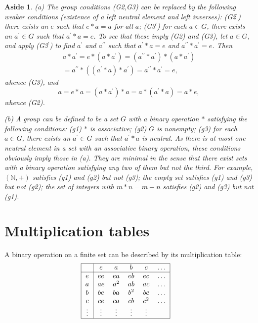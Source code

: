 \documentclass[a4paper,11pt,final]{memoir}%
\newtheorem{aside}[X]{Aside}
\theoremstyle{nonumberplain}
\begin{document}
\begin{aside}
\label{bd3z}(a) The group conditions (G2,G3) can be replaced by the following
weaker conditions (existence of a left neutral element and left inverses):
(G2$^{\prime}$) there exists an $e$ such that $e\ast a=a$ for all $a$;
(G3$^{\prime}$) for each $a\in G$, there exists an $a^{\prime}\in G$ such that
$a^{\prime}\ast a=e$. To see that these imply (G2) and (G3), let $a\in G$, and
apply (G3$^{\prime}$) to find $a^{\prime}$ and $a^{\prime\prime}$ such that
$a^{\prime}\ast a=e$ and $a^{\prime\prime}\ast a^{\prime}=e$. Then%
\begin{align*}
a\ast a^{\prime}=e\ast(a\ast a^{\prime})=(a^{\prime\prime}\ast a^{\prime}%
)\ast(a\ast a^{\prime})\\
=a^{\prime\prime}\ast\left(  (a^{\prime}\ast a)\ast
a^{\prime}\right)  =a^{\prime\prime}\ast a^{\prime}=e,
\end{align*}
whence (G3), and%
\[
a=e\ast a=(a\ast a^{\prime})\ast a=a\ast(a^{\prime}\ast a)=a\ast e,
\]
whence (G2).

(b) A group can be defined to be a set $G$ with a binary operation $\ast$
satisfying the following conditions: (g1) $\ast$ is associative; (g2) $G$ is
nonempty; (g3) for each $a\in G$, there exists an $a^{\prime}\in G$ such that
$a^{\prime}\ast a$ is neutral. As there is at most one neutral element in a
set with an associative binary operation, these conditions obviously imply
those in (a). They are minimal in the sense that there exist sets with a
binary operation satisfying any two of them but not the third. For example,
$(\mathbb{N}{},+)$ satisfies (g1) and (g2) but not (g3); the empty set
satisfies (g1) and (g3) but not (g2); the set of integers with $m*n=m-n$
satisfies (g2) and (g3) but not (g1).
\end{aside}

\section{Multiplication tables}

A binary operation on a finite set can be described by its multiplication
table:%
\[%
\begin{tabular}
[c]{|c|ccccc|}\hline
& $e$ & $a$ & $b$ & $c$ & $\ldots$\\\hline
$e$ & $ee$ & $ea$ & $eb$ & $ec$ & $\ldots$\\
$a$ & $ae$ & $a^{2}$ & $ab$ & $ac$ & $\ldots$\\
$b$ & $be$ & $ba$ & $b^{2}$ & $bc$ & $\ldots$\\
$c$ & $ce$ & $ca$ & $cb$ & $c^{2}$ & $\ldots$\\
$\vdots$ & $\vdots$ & $\vdots$ & $\vdots$ & $\vdots$ & \\\hline
\end{tabular}
\ \ \
\]
\end{document}
